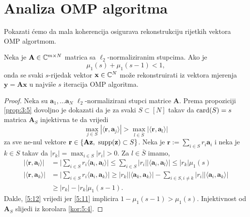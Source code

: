 \documentclass[a4paper,twoside,12pt]{memoir} %
\newcommand{\vect}[1]{\mathbf{#1}}
\renewcommand{\vec}{\vect}
\newcommand{\card}{\text{\normalfont{card}}}
\newcommand{\supp}{\text{\normalfont{supp}}}
\begin{document}
\newpage
\section[Analiza OMP algoritma][Analiza OMP algoritma]{Analiza OMP algoritma}
Pokazati \'cemo da mala koherencija osigurava rekonstrukciju rijetkih vektora OMP algortmom.
\begin{thm}\label{tm:5:14}
    Neka je $\vec A \in \C^{m \times N}$ matrica sa $\ell_2$-normaliziranim stupcima. Ako je 
    \begin{equation}\label{5:11}
        \mu_1(s) + \mu_1(s-1) < 1, 
    \end{equation}
    onda se svaki $s$-rijedak vektor $\vec x \in \C^N$ mo\v{z}e rekonstruirati iz vektora mjerenja $\vec y = \vec{Ax}$ u najvi\v{s}e $s$ iteracija OMP algoritma.
\end{thm}
\begin{proof}
    Neka su $\vec a_1, \dots \vec a_N$ $\ell_2$-normalizirani stupci matrice $\vec A$. Prema propoziciji \ref{prop:3:5} dovoljno je dokazati da je za svaki $S \subset [N]$ takav da $\card(S) = s$ matrica $\vec A_S$ injektivna te da vrijedi
    \begin{equation}\label{5:12}
        \max_{j \in S} |\langle \vec r,\vec a_j \rangle|  > \max_{l \in \bar S} |\langle \vec r, \vec a_l \rangle|
    \end{equation}
    za sve ne-nul vektore $\vec r \in \{\vec{Az},\ \supp(\vec z) \subset S\}$. Neka je $\vec r := \sum_{i \in S}r_i \vec a_i$ i neka je $k \in S$ takav da $|r_k| = \max_{i \in S} |r_i| > 0$. Za $l \in \bar S$ imamo,
    \begin{align*}
        |\langle \vec r, \vec a_l \rangle| &= \big | \sum_{i \in S}r_i \langle \vec a_i, \vec a_l \rangle \big | \leq \sum_{i \in S}|r_i||\langle \vec a_i, \vec a_l \rangle| \leq |r_k| \mu_1(s) \\
        |\langle \vec r, \vec a_k \rangle| &= \big | \sum_{i \in S}r_i \langle \vec a_i, \vec a_k \rangle \big |  \geq |r_k| |\langle \vec a_k, \vec a_k \rangle| - \sum_{i \in S, i \neq k}|r_i||\langle \vec a_i, \vec a_k \rangle| \\
        &\geq |r_k| - |r_k|\mu_1(s-1).
    \end{align*}
    Dakle, \eqref{5:12} vrijedi jer \eqref{5:11} implicira $1-\mu_1(s-1) > \mu_1(s)$. Injektivnost od $\vec A_S$ slijedi iz korolara \ref{kor:5:4}.
\end{proof}
\end{document}
